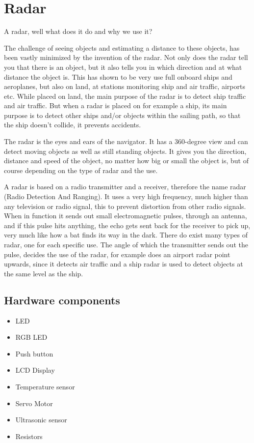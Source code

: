 \chapter{Radar}
A radar, well what does it do and why we use it? 

The challenge of seeing objects and estimating a distance to these objects, has been vastly minimized by the invention of the radar. Not only does the radar tell you that there is an object, but it also tells you in which direction and at what distance the object is. This has shown to be very use full onboard ships and aeroplanes, but also on land, at stations monitoring ship and air traffic, airports etc. While placed on land, the main purpose of the radar is to detect ship traffic and air traffic. But when a radar is placed on for example a ship, its main purpose is to detect other ships and/or objects within the sailing path, so that the ship doesn't collide, it prevents accidents. 

The radar is the eyes and ears of the navigator. It has a 360-degree view and can detect moving objects as well as still standing objects. It gives you the direction, distance and speed of the object, no matter how big or small the object is, but of course depending on the type of radar and the use.  

A radar is based on a radio transmitter and a receiver, therefore the name radar (Radio Detection And Ranging). It uses a very high frequency, much higher than any television or radio signal, this to prevent distortion from other radio signals. When in function it sends out small electromagnetic pulses, through an antenna, and if this pulse hits anything, the echo gets sent back for the receiver to pick up, very much like how a bat finds its way in the dark. There do exist many types of radar, one for each specific use. The angle of which the transmitter sends out the pulse, decides the use of the radar, for example does an airport radar point upwards, since it detects air traffic and a ship radar is used to detect objects at the same level as the ship.

\section{Hardware components}
\begin{itemize}
  \item LED
  \item RGB LED
  \item Push button
  \item LCD Display
  \item Temperature sensor 
  \item Servo Motor 
  \item Ultrasonic sensor
  \item Resistors
\end{itemize}

